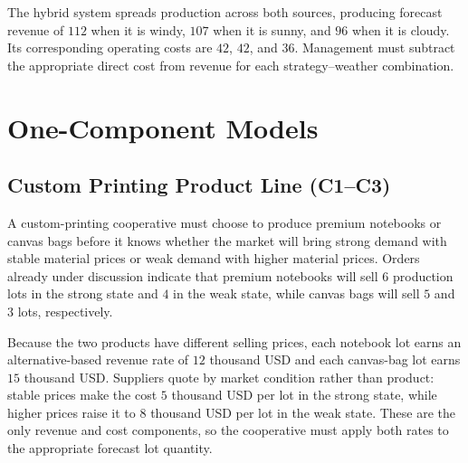 	The hybrid system spreads production across both sources, producing forecast revenue of \(112\) when it is windy, \(107\) when it is sunny, and \(96\) when it is cloudy. Its corresponding operating costs are \(42\), \(42\), and \(36\). Management must subtract the appropriate direct cost from revenue for each strategy--weather combination.

	\section{One-Component Models}
	\label{sec:one-component-models}


	\subsection{Custom Printing Product Line (C1--C3)}
	\label{sec:problem5-custom-printing-product-line-c1-c3}

	A custom-printing cooperative must choose to produce premium notebooks or canvas bags before it knows whether the market will bring strong demand with stable material prices or weak demand with higher material prices. Orders already under discussion indicate that premium notebooks will sell \(6\) production lots in the strong state and \(4\) in the weak state, while canvas bags will sell \(5\) and \(3\) lots, respectively.

	Because the two products have different selling prices, each notebook lot earns an alternative-based revenue rate of \(12\) thousand USD and each canvas-bag lot earns \(15\) thousand USD. Suppliers quote by market condition rather than product: stable prices make the cost \(5\) thousand USD per lot in the strong state, while higher prices raise it to \(8\) thousand USD per lot in the weak state. These are the only revenue and cost components, so the cooperative must apply both rates to the appropriate forecast lot quantity.

